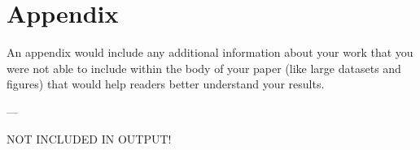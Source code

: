 \chapter{Appendix}\label{ch:appendix}

An appendix would include any additional information about your work that you were not able to include within the body of your paper (like large datasets and figures) that would help readers better understand your results.

---

NOT INCLUDED IN OUTPUT!